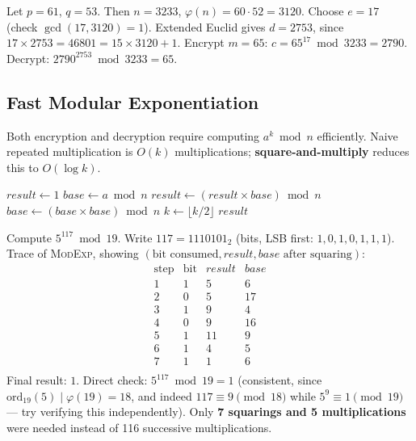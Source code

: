 \begin{example}
Let $p = 61$, $q = 53$. Then $n = 3233$, $\varphi(n) = 60 \cdot 52 = 3120$.
Choose $e = 17$ (check $\gcd(17,3120)=1$). Extended Euclid gives $d = 2753$, since $17 \times 2753 = 46801 = 15 \times 3120 + 1$.
Encrypt $m = 65$: $c = 65^{17} \bmod 3233 = 2790$. Decrypt: $2790^{2753} \bmod 3233 = 65$. \checkmark
\end{example}

\subsection{Fast Modular Exponentiation}
Both encryption and decryption require computing $a^{k} \bmod n$ efficiently. Naive repeated multiplication is $O(k)$ multiplications; \textbf{square-and-multiply} reduces this to $O(\log k)$.

\begin{algorithm}[h]
\caption{Square-and-Multiply (Right-to-Left)}\label{alg:modexp}
\begin{algorithmic}[1]
    \State $result \gets 1$
    \State $base \gets a \bmod n$
            \State $result \gets (result \times base) \bmod n$
        \EndIf
        \State $base \gets (base \times base) \bmod n$
        \State $k \gets \lfloor k / 2 \rfloor$
    \EndWhile
    \State \Return $result$
\EndFunction
\end{algorithmic}
\end{algorithm}

\begin{example}
Compute $5^{117} \bmod 19$. Write $117 = 1110101_2$ (bits, LSB first: $1,0,1,0,1,1,1$). Trace of \textsc{ModExp}, showing $(\text{bit consumed}, result, base \text{ after squaring})$:
\[
\begin{array}{c|ccc}
\text{step} & \text{bit} & result & base \\
\hline
1 & 1 & 5 & 6 \\
2 & 0 & 5 & 17 \\
3 & 1 & 9 & 4 \\
4 & 0 & 9 & 16 \\
5 & 1 & 11 & 9 \\
6 & 1 & 4 & 5 \\
7 & 1 & 1 & 6 \\
\end{array}
\]
Final result: $1$. Direct check: $5^{117} \bmod 19 = 1$ (consistent, since $\mathrm{ord}_{19}(5) \mid \varphi(19) = 18$, and indeed $117 \equiv 9 \pmod{18}$ while $5^9 \equiv 1 \pmod{19}$ — try verifying this independently). Only \textbf{7 squarings and 5 multiplications} were needed instead of 116 successive multiplications.
\end{example}

